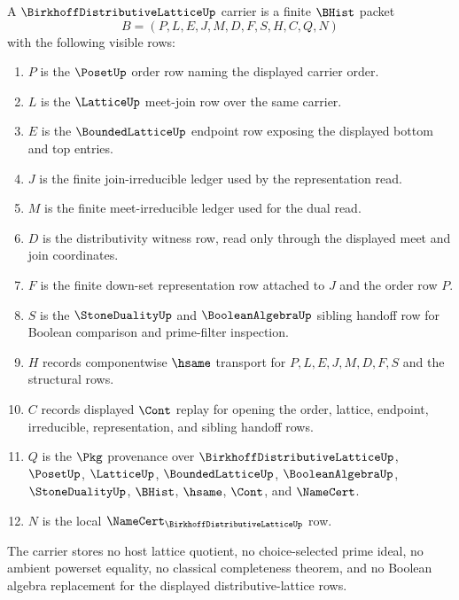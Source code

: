 \begin{definition}
\label{def:birkhoff-distributive-lattice-carrier}
A $\BirkhoffDistributiveLatticeUp$ carrier is a finite $\BHist$ packet
$$
B=(P,L,E,J,M,D,F,S,H,C,Q,N)
$$
with the following visible rows:
\begin{enumerate}
\item $P$ is the $\PosetUp$ order row naming the displayed carrier order.
\item $L$ is the $\LatticeUp$ meet-join row over the same carrier.
\item $E$ is the $\BoundedLatticeUp$ endpoint row exposing the displayed bottom and top entries.
\item $J$ is the finite join-irreducible ledger used by the representation read.
\item $M$ is the finite meet-irreducible ledger used for the dual read.
\item $D$ is the distributivity witness row, read only through the displayed meet and join coordinates.
\item $F$ is the finite down-set representation row attached to $J$ and the order row $P$.
\item $S$ is the $\StoneDualityUp$ and $\BooleanAlgebraUp$ sibling handoff row for Boolean comparison and prime-filter inspection.
\item $H$ records componentwise $\hsame$ transport for $P,L,E,J,M,D,F,S$ and the structural rows.
\item $C$ records displayed $\Cont$ replay for opening the order, lattice, endpoint, irreducible, representation, and sibling handoff rows.
\item $Q$ is the $\Pkg$ provenance over $\BirkhoffDistributiveLatticeUp$, $\PosetUp$, $\LatticeUp$, $\BoundedLatticeUp$, $\BooleanAlgebraUp$, $\StoneDualityUp$, $\BHist$, $\hsame$, $\Cont$, and $\NameCert$.
\item $N$ is the local $\NameCert_{\BirkhoffDistributiveLatticeUp}$ row.
\end{enumerate}
The carrier stores no host lattice quotient, no choice-selected prime ideal, no ambient powerset equality, no classical completeness theorem, and no Boolean algebra replacement for the displayed distributive-lattice rows.
\end{definition}

